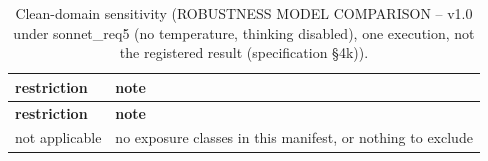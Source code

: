 \begingroup\footnotesize
\begin{longtable}{>{\raggedright\arraybackslash}p{126.4pt}>{\raggedright\arraybackslash}p{304.6pt}}
\caption{Clean-domain sensitivity (ROBUSTNESS MODEL COMPARISON -- v1.0 under sonnet\_\allowbreak{}req5 (no temperature, thinking disabled), one execution, not the registered result (specification §4k)).} \\
\toprule
\textbf{restriction} & \textbf{note} \\
\midrule
\endfirsthead
\toprule
\textbf{restriction} & \textbf{note} \\
\midrule
\endhead
\bottomrule
\endfoot
not applicable & no exposure classes in this manifest, or nothing to exclude \\
\end{longtable}
\endgroup
